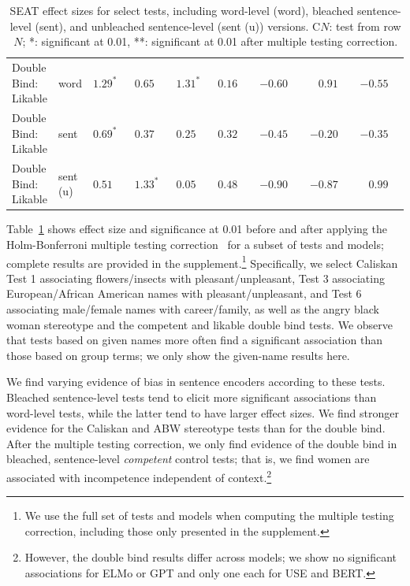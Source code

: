 \documentclass[11pt,a4paper]{article}
\begin{document}
\begin{table}[t]
\begin{tabular}{llrrrrrrr}
Double Bind: Likable & word & $1.29^{*\phantom{*}}$ & $0.65\phantom{^{**}}$ & $1.31^{*\phantom{*}}$ & $0.16\phantom{^{**}}$ & $-0.60\phantom{^{**}}$ & $0.91\phantom{^{**}}$ & $-0.55\phantom{^{**}}$ \\
Double Bind: Likable & sent & $0.69^{*\phantom{*}}$ & $0.37\phantom{^{**}}$ & $0.25\phantom{^{**}}$ & $0.32\phantom{^{**}}$ & $-0.45\phantom{^{**}}$ & $-0.20\phantom{^{**}}$ & $-0.35\phantom{^{**}}$ \\
Double Bind: Likable & sent (u) & $0.51\phantom{^{**}}$ & $1.33^{*\phantom{*}}$ & $0.05\phantom{^{**}}$ & $0.48\phantom{^{**}}$ & $-0.90\phantom{^{**}}$ & $-0.87\phantom{^{**}}$ & $0.99\phantom{^{**}}$ \\
     
     \bottomrule
    \end{tabular}
    \caption{SEAT effect sizes for select tests, including word-level (word), bleached sentence-level (sent), and unbleached sentence-level (sent (u)) versions.  C$N$: test from \citet[Table 1]{caliskan2017semantics} row $N$; *: significant at \num{0.01}, **: significant at \num{0.01} after multiple testing correction.}
    \label{tab:effect-sizes}
\end{table}

Table~\ref{tab:effect-sizes} shows effect size and significance at 0.01 before and after applying the Holm-Bonferroni multiple testing correction~\cite{holm1979simple} for a subset of tests and models; complete results are provided in the supplement.\footnote{
    We use the full set of tests and models when computing the multiple testing correction, including those only presented in the supplement.
}
Specifically, we select Caliskan Test 1 associating flowers/insects with pleasant/unpleasant, Test 3 associating European/African American names with pleasant/unpleasant, and Test 6 associating male/female names with career/family, as well as the angry black woman stereotype and the competent and likable double bind tests.
We observe that tests based on given names more often find a significant association than those based on group terms; we only show the given-name results here.

We find varying evidence of bias in sentence encoders according to these tests.
Bleached sentence-level tests tend to elicit more significant associations than word-level tests, while the latter tend to have larger effect sizes.
We find stronger evidence for the Caliskan and ABW stereotype tests than for the double bind. 
After the multiple testing correction, we only find evidence of the double bind in bleached, sentence-level \emph{competent} control tests; that is, we find women are associated with incompetence independent of context.\footnote{
    However, the double bind results differ across models; we show no significant associations for ELMo or GPT and only one each for USE and BERT.
}
\end{document}
